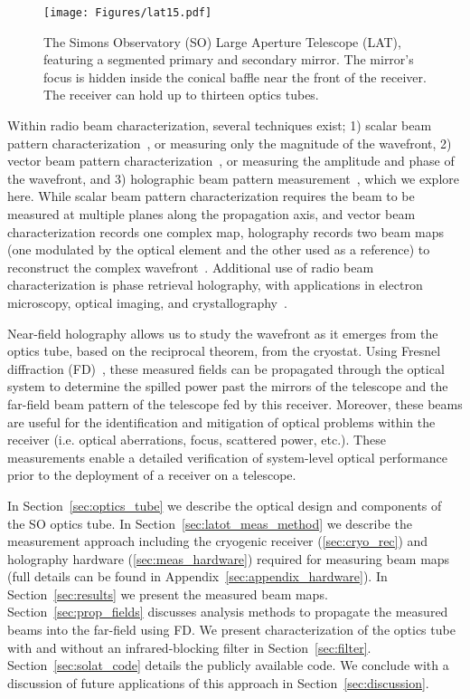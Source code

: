 \begin{figure}[ht]
    \centering
    \texttt{[image: Figures/lat15.pdf]}
    \caption{The Simons Observatory (SO) Large Aperture Telescope (LAT), featuring a segmented primary and secondary mirror.  The mirror's focus is hidden inside the conical baffle near the front of the receiver.  The receiver can hold up to thirteen optics tubes.}
    \label{fig:lat}
\end{figure}

Within radio beam characterization, several techniques exist; 1) scalar beam pattern characterization~\cite{doi:10.1063/1.3292308}, or measuring only the magnitude of the wavefront, 2) vector beam pattern characterization~\cite{2020JLTP..199..156Y,7740846}, or measuring the amplitude and phase of the wavefront, and 3) holographic beam pattern measurement~\cite{387181,7740846}, which we explore here.  While scalar beam pattern characterization requires the beam to be measured at multiple planes along the propagation axis, and vector beam characterization records one complex map, holography records two beam maps (one modulated by the optical element and the other used as a reference) to reconstruct the complex wavefront~\cite{4584681,alma_holog}.  Additional use of radio beam characterization is phase retrieval holography, with applications in electron microscopy, optical imaging, and crystallography~\cite{7078985}.

Near-field holography allows us to study the wavefront as it emerges from the optics tube, based on the reciprocal theorem, from the cryostat.  Using Fresnel diffraction (FD)~\cite{Goodman2005-ne}, these measured fields can be propagated through the optical system to determine the spilled power past the mirrors of the telescope and the far-field beam pattern of the telescope fed by this receiver.  Moreover, these beams are useful for the identification and mitigation of optical problems within the receiver (i.e. optical aberrations, focus, scattered power, etc.).  These measurements enable a detailed verification of system-level optical performance prior to the deployment of a receiver on a telescope.

In Section~\ref{sec:optics_tube} we describe the optical design and components of the SO optics tube.  In Section~\ref{sec:latot_meas_method} we describe the measurement approach including the cryogenic receiver (\ref{sec:cryo_rec}) and holography hardware (\ref{sec:meas_hardware}) required for measuring beam maps (full details can be found in Appendix~\ref{sec:appendix_hardware}).  In Section~\ref{sec:results} we present the measured beam maps.   Section~\ref{sec:prop_fields} discusses analysis methods to propagate the measured beams into the far-field using FD.  We present characterization of the optics tube with and without an infrared-blocking filter in Section~\ref{sec:filter}.  Section~\ref{sec:solat_code} details the publicly available code.  We conclude with a discussion of future applications of this approach in Section~\ref{sec:discussion}.  

